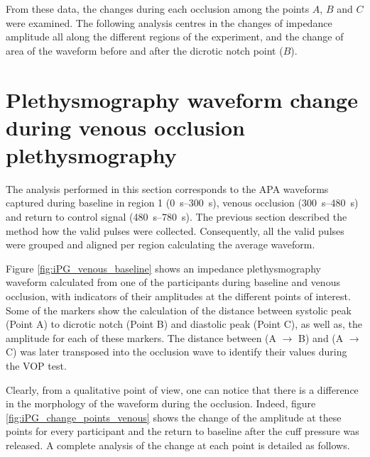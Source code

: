 From these data, the changes during each occlusion among the points $A$, $B$ and $C$  were examined. The following analysis centres in the changes of impedance amplitude all along the different regions of the experiment, and the change of area of the waveform before and after the dicrotic notch point ($B$).

\section{Plethysmography waveform change during venous occlusion plethysmography}
\label{section apa 2}
The analysis performed in this section corresponds to the APA waveforms captured during baseline in region 1 (\SIrange{0}{300}{\second}), venous occlusion (\SIrange{300}{480}{\second}) and return to control signal (\SIrange{480}{780}{\second}).  The previous section described the method how the valid pulses were collected. Consequently, all the valid pulses were grouped and aligned per region calculating the average waveform. 

Figure \ref{fig:iPG_venous_baseline} shows an impedance plethysmography waveform calculated from one of the participants during baseline and venous occlusion, with indicators of their amplitudes at the different points of interest. Some of the markers show the calculation of the distance between systolic peak (Point A) to dicrotic notch (Point B) and diastolic peak (Point C), as well as, the amplitude for each of these markers. The distance between (A $\rightarrow$ B) and (A $\rightarrow$ C) was later transposed into the occlusion wave to identify their values during the VOP test.

Clearly,  from a qualitative point of view, one can notice that there is a difference in the morphology of the waveform during the occlusion.  Indeed, figure \ref{fig:iPG_change_points_venous} shows the change of the amplitude at these points for every participant and the return to baseline after the cuff pressure was released. A complete analysis of the change at each point is detailed as follows.

